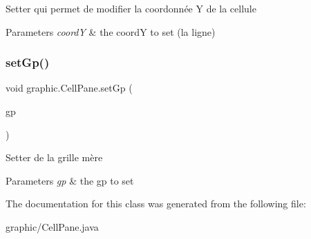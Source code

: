 Setter qui permet de modifier la coordonnée Y de la cellule 
\begin{DoxyParams}{Parameters}
{\em coordY} & the coordY to set (la ligne) \\
\hline
\end{DoxyParams}
\hypertarget{classgraphic_1_1_cell_pane_aa61724c598a72a3b1968bc07bb2c29aa}{}\label{classgraphic_1_1_cell_pane_aa61724c598a72a3b1968bc07bb2c29aa} 
\subsubsection{\texorpdfstring{set\+Gp()}{setGp()}}
{\footnotesize\ttfamily void graphic.\+Cell\+Pane.\+set\+Gp (\begin{DoxyParamCaption}\item[{\hyperlink{classgraphic_1_1_grid_panel}{Grid\+Panel}}]{gp }\end{DoxyParamCaption})}

Setter de la grille mère 
\begin{DoxyParams}{Parameters}
{\em gp} & the gp to set \\
\hline
\end{DoxyParams}


The documentation for this class was generated from the following file\+:\begin{DoxyCompactItemize}
\item 
graphic/Cell\+Pane.\+java\end{DoxyCompactItemize}
